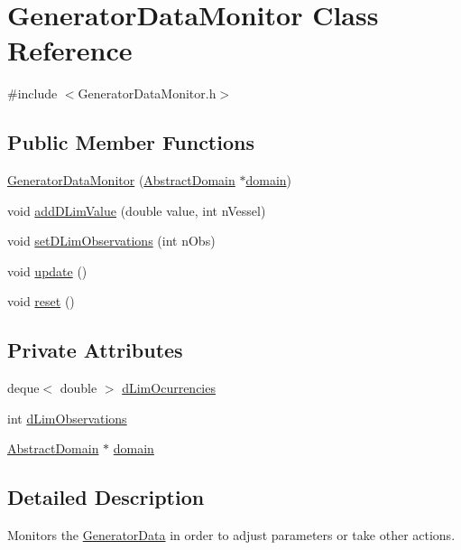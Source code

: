 \hypertarget{class_generator_data_monitor}{}\section{Generator\+Data\+Monitor Class Reference}
\label{class_generator_data_monitor}


{\ttfamily \#include $<$Generator\+Data\+Monitor.\+h$>$}

\subsection*{Public Member Functions}
\begin{DoxyCompactItemize}
\item 
\hyperlink{class_generator_data_monitor_ad01741c9881ff6b0454de5767c862f8f}{Generator\+Data\+Monitor} (\hyperlink{class_abstract_domain}{Abstract\+Domain} $\ast$\hyperlink{class_generator_data_monitor_adb19db594dbfa2e5b5339c69a303e3ad}{domain})
\item 
void \hyperlink{class_generator_data_monitor_a1a7d8a72fed598adccbc9b7334e02884}{add\+D\+Lim\+Value} (double value, int n\+Vessel)
\item 
void \hyperlink{class_generator_data_monitor_a916af64c1cf8f44e24680e9e8313a11c}{set\+D\+Lim\+Observations} (int n\+Obs)
\item 
void \hyperlink{class_generator_data_monitor_a13afe7e8254e0ba2251ea5474102d693}{update} ()
\item 
void \hyperlink{class_generator_data_monitor_ac9c1f1e87e9dfe9248b326ac17a6cf3b}{reset} ()
\end{DoxyCompactItemize}
\subsection*{Private Attributes}
\begin{DoxyCompactItemize}
\item 
deque$<$ double $>$ \hyperlink{class_generator_data_monitor_a75372d1fc417bca41eb53895132cfc8c}{d\+Lim\+Ocurrencies}
\item 
int \hyperlink{class_generator_data_monitor_aa6d072da586a1f39d63cb3b5ce293d5a}{d\+Lim\+Observations}
\item 
\hyperlink{class_abstract_domain}{Abstract\+Domain} $\ast$ \hyperlink{class_generator_data_monitor_adb19db594dbfa2e5b5339c69a303e3ad}{domain}
\end{DoxyCompactItemize}


\subsection{Detailed Description}
Monitors the \hyperlink{class_generator_data}{Generator\+Data} in order to adjust parameters or take other actions. 

